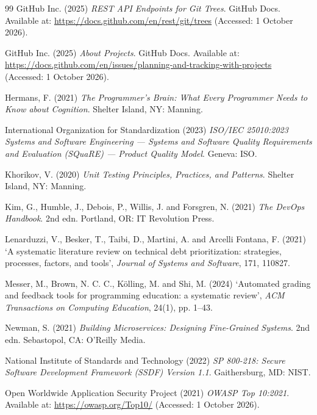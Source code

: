\documentclass[a4paper,11pt]{article}
\begin{document}
\begin{thebibliography}{99}
GitHub Inc. (2025) \textit{REST API Endpoints for Git Trees}. GitHub Docs.
Available at: \url{https://docs.github.com/en/rest/git/trees} (Accessed: 1 October 2026).

GitHub Inc. (2025) \textit{About Projects}. GitHub Docs. Available at:
\url{https://docs.github.com/en/issues/planning-and-tracking-with-projects}
(Accessed: 1 October 2026).

Hermans, F. (2021) \textit{The Programmer's Brain: What Every Programmer Needs
to Know about Cognition}. Shelter Island, NY: Manning.

International Organization for Standardization (2023) \textit{ISO/IEC
25010:2023 Systems and Software Engineering --- Systems and Software Quality
Requirements and Evaluation (SQuaRE) --- Product Quality Model}. Geneva: ISO.

Khorikov, V. (2020) \textit{Unit Testing Principles, Practices, and Patterns}.
Shelter Island, NY: Manning.

Kim, G., Humble, J., Debois, P., Willis, J. and Forsgren, N. (2021) \textit{The
DevOps Handbook}. 2nd edn. Portland, OR: IT Revolution Press.

Lenarduzzi, V., Besker, T., Taibi, D., Martini, A. and Arcelli Fontana, F.
(2021) `A systematic literature review on technical debt prioritization:
strategies, processes, factors, and tools', \textit{Journal of Systems and
Software}, 171, 110827.

Messer, M., Brown, N. C. C., K\"{o}lling, M. and Shi, M. (2024) `Automated
grading and feedback tools for programming education: a systematic review',
\textit{ACM Transactions on Computing Education}, 24(1), pp. 1--43.

Newman, S. (2021) \textit{Building Microservices: Designing Fine-Grained
Systems}. 2nd edn. Sebastopol, CA: O'Reilly Media.

National Institute of Standards and Technology (2022) \textit{SP 800-218:
Secure Software Development Framework (SSDF) Version 1.1}. Gaithersburg, MD: NIST.

Open Worldwide Application Security Project (2021) \textit{OWASP Top 10:2021}.
Available at: \url{https://owasp.org/Top10/} (Accessed: 1 October 2026).


\end{thebibliography}
\end{document}
